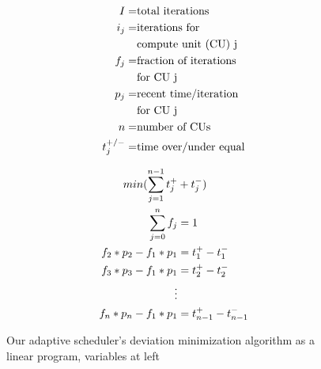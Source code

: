 \begin{figure}[t]
  \footnotesize
  \begin{minipage}[b]{1\columnwidth}
    \begin{minipage}[c]{.41\columnwidth}
      \begin{align}
        I     =& \textrm{total iterations}\notag\\
        i_j   =& \textrm{iterations for}\notag\\
               & \textrm{compute unit~(CU) j}\notag\\
        f_j   =& \textrm{fraction of iterations}\notag\\
               & \textrm{for CU j}\notag\\
        p_j   =& \textrm{recent time/iteration}\notag\\
               & \textrm{for CU j}\notag\\
        n     =& \textrm{number of CUs}\notag\\
        t_j^{+/-} =& \textrm{time over/under equal\notag}
      \end{align}
    \end{minipage}
    \begin{minipage}[c]{.56\columnwidth}
      \begin{align}
        \label{eqn:o2} min(\sum\limits_{j=1}^{n-1} t_j^+ &+ t_j^-)\\
        \label{eqn:lps2}\sum\limits_{j=0}^n f_j &= 1\\
        f_2 * p_2 - f_1 * p_1 &= t_1^+ - t_1^-\\
        f_3 * p_3 - f_1 * p_1 &= t_2^+ - t_2^-\\
        \vdots\notag\\
        \label{eqn:lpe2}f_n * p_n - f_1 *  p_1 &= t_{n-1}^+ - t_{n-1}^-
      \end{align}
    \end{minipage}
  \end{minipage}
  \normalsize
  \caption{Our adaptive scheduler's deviation minimization algorithm as a
    linear program, variables at left}
  \label{fig:lp_stuff}
\end{figure}

